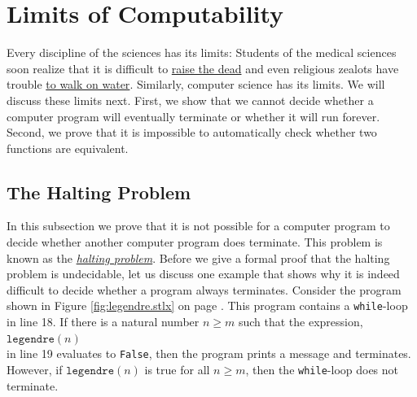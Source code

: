 \chapter{Limits of Computability}
Every discipline of the sciences has its limits: Students of the medical sciences soon realize that
it is difficult to \href{http://www.wowhead.com/spell=61999}{raise the dead} and even religious zealots
have trouble \href{http://www.youtube.com/watch?v=RUMX_b_m3Js}{to walk on water}.  Similarly,
computer science has its limits.  We will discuss 
these limits next.  First, we show that we cannot decide whether a computer program will eventually
terminate or whether it will run forever.  
Second, we prove that it is impossible to automatically check whether two functions are equivalent.


\section{The Halting Problem}
In this subsection we prove that it is not possible for a computer program to decide whether 
another computer program does terminate.  This problem is known as the 
\href{http://en.wikipedia.org/wiki/Halting_problem}{\emph{halting problem}}.
Before we give a formal proof that the halting problem is undecidable, let us
discuss one example that shows why it is indeed difficult to decide whether a program always
terminates.  Consider the program shown in Figure \ref{fig:legendre.stlx} on page
\pageref{fig:legendre.stlx}.  This program contains a \texttt{while}-loop in line 18.  
If there is a natural number $n \geq m$ such that the expression,
\\[0.2cm]
\hspace*{1.3cm}
$\mathtt{legendre}(n)$
\\[0.2cm]
in line 19 evaluates to \texttt{False}, then the program prints a message and terminates.   However, if 
$\mathtt{legendre}(n)$ is true for all $n \geq m$, then the \texttt{while}-loop does not terminate.

